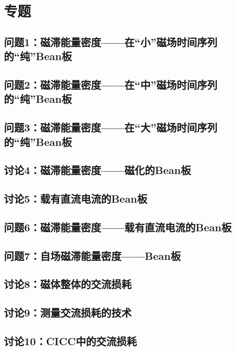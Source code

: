 \section{专题}
\subsection{问题1：磁滞能量密度——在“小”磁场时间序列的“纯”Bean板}

\newpage
\subsection{问题2：磁滞能量密度——在“中”磁场时间序列的“纯”Bean板}

\newpage
\subsection{问题3：磁滞能量密度——在“大”磁场时间序列的“纯”Bean板}

\newpage
\subsection{讨论4：磁滞能量密度——磁化的Bean板}

\newpage
\subsection{讨论5：载有直流电流的Bean板}

\newpage
\subsection{问题6：磁滞能量密度——载有直流电流的Bean板}

\newpage
\subsection{问题7：自场磁滞能量密度——Bean板}

\newpage
\subsection{讨论8：磁体整体的交流损耗}

\newpage
\subsection{讨论9：测量交流损耗的技术}

\newpage
\subsection{讨论10：CICC中的交流损耗}

